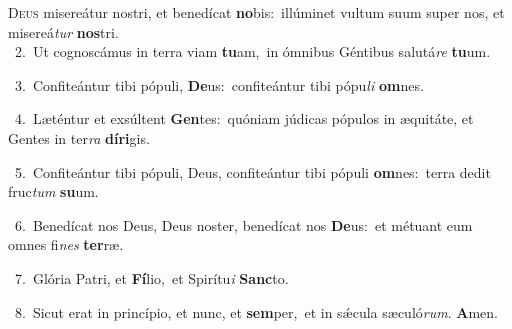 \lettrine{\initial\textcolor{\initialcolor}{D}}{eus} misereátur nostri, et benedícat \textbf{no}\-bis:~\star illúminet vultum suum super nos, et misereá\textit{tur} \textbf{nos}\-tri.\\
{\numbfont\textcolor{\numbcolor}{~2.}}~Ut cognoscámus in terra viam \textbf{tu}\-am,~\star in ómnibus Géntibus salutá\textit{re} \textbf{tu}\-um.\par
{\numbfont\textcolor{\numbcolor}{~3.}}~Confiteántur tibi pópuli, \textbf{De}\-us:~\star confiteántur tibi pópu\textit{li} \textbf{om}\-nes.\par
{\numbfont\textcolor{\numbcolor}{~4.}}~Læténtur et exsúltent \textbf{Gen}\-tes:~\star quóniam júdicas pópulos in æquitáte, et Gentes in ter\textit{ra} \textbf{dí}\-\textbf{ri}gis.\par
{\numbfont\textcolor{\numbcolor}{~5.}}~Confiteántur tibi pópuli, Deus, confiteántur tibi pópuli \textbf{om}\-nes:~\star terra dedit fruc\textit{tum} \textbf{su}\-um.\par
{\numbfont\textcolor{\numbcolor}{~6.}}~Benedícat nos Deus, Deus noster, benedícat nos \textbf{De}\-us:~\star et métuant eum omnes fi\textit{nes} \textbf{ter}\-ræ.\par
{\numbfont\textcolor{\numbcolor}{~7.}}~Glória Patri, et \textbf{Fí}\-lio,~\star et Spirítu\textit{i} \textbf{Sanc}\-to.\par
{\numbfont\textcolor{\numbcolor}{~8.}}~Sicut erat in princípio, et nunc, et \textbf{sem}\-per,~\star et in sǽcula sæculó\-\textit{rum}\-. \textbf{A}\-men.\par
